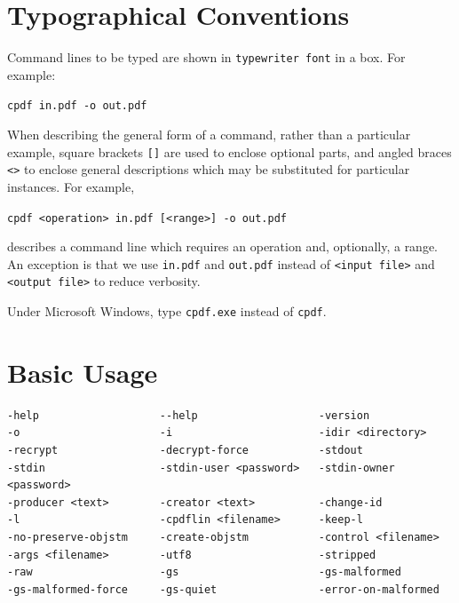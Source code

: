 \documentclass{book}
\begin{document}
\pagestyle{plain}
\tableofcontents\clearpage\pagestyle{empty}

\cleardoublepage
\pagestyle{plain}
\chapter*{Typographical Conventions}
Command lines to be typed are shown in \texttt{typewriter\hspace{-1mm} font} in a box.
For example:
\begin{framed}
\noindent\small\verb!cpdf in.pdf -o out.pdf!
\end{framed}
\noindent When describing the general form of a command, rather than a particular
example, square brackets \verb|[]| are used to enclose optional parts, and
angled braces \verb!<>! to enclose general descriptions which may be
substituted for particular instances. For example,
\begin{framed}
\noindent\small\verb!cpdf <operation> in.pdf [<range>] -o out.pdf!
\end{framed}
\noindent describes a command line which requires an operation and, optionally,
a range. An exception is that we use \texttt{in.pdf} and \texttt{out.pdf}
instead of \texttt{<input file>} and \texttt{<output file>} to reduce
verbosity.

Under Microsoft Windows, type \texttt{cpdf.exe} instead of \texttt{cpdf}.
\clearpage\pagestyle{empty}\cleardoublepage
\mainmatter
\pagestyle{fancy}



\chapter{Basic Usage}\label{chap:1}


\label{basicusage}
  \begin{framed}
  \small
\noindent\begin{verbatim}
-help                   --help                   -version 
-o                      -i                       -idir <directory>
-recrypt                -decrypt-force           -stdout
-stdin                  -stdin-user <password>   -stdin-owner <password>  
-producer <text>        -creator <text>          -change-id
-l                      -cpdflin <filename>      -keep-l
-no-preserve-objstm     -create-objstm           -control <filename>
-args <filename>        -utf8                    -stripped
-raw                    -gs                      -gs-malformed
-gs-malformed-force     -gs-quiet                -error-on-malformed\end{verbatim}\end{framed}
\end{document}
